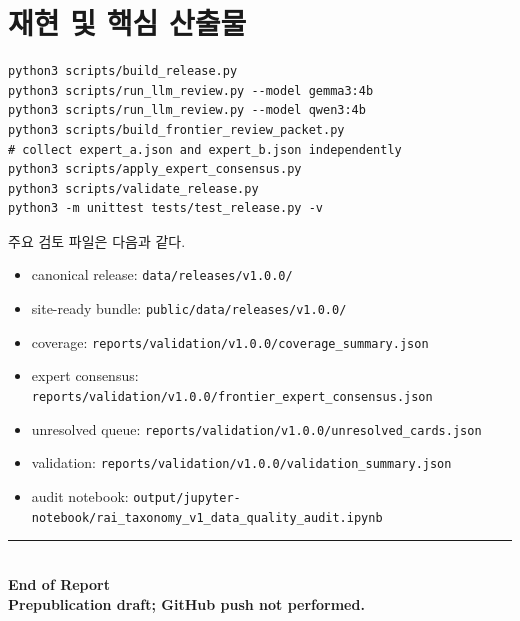 \documentclass[11pt,a4paper]{article}
\begin{document}
\section{재현 및 핵심 산출물}

\begin{lstlisting}[style=compact]
python3 scripts/build_release.py
python3 scripts/run_llm_review.py --model gemma3:4b
python3 scripts/run_llm_review.py --model qwen3:4b
python3 scripts/build_frontier_review_packet.py
# collect expert_a.json and expert_b.json independently
python3 scripts/apply_expert_consensus.py
python3 scripts/validate_release.py
python3 -m unittest tests/test_release.py -v
\end{lstlisting}

주요 검토 파일은 다음과 같다.

\begin{itemize}
  \item canonical release: \nolinkurl{data/releases/v1.0.0/}
  \item site-ready bundle: \nolinkurl{public/data/releases/v1.0.0/}
  \item coverage: \nolinkurl{reports/validation/v1.0.0/coverage_summary.json}
  \item expert consensus: \nolinkurl{reports/validation/v1.0.0/frontier_expert_consensus.json}
  \item unresolved queue: \nolinkurl{reports/validation/v1.0.0/unresolved_cards.json}
  \item validation: \nolinkurl{reports/validation/v1.0.0/validation_summary.json}
  \item audit notebook: \nolinkurl{output/jupyter-notebook/rai_taxonomy_v1_data_quality_audit.ipynb}
\end{itemize}

\vfill
\begin{center}
\color{reportblue}\rule{0.72\linewidth}{0.5pt}\\[0.45em]
\sffamily\bfseries End of Report\\
\sffamily\small Prepublication draft; GitHub push not performed.
\end{center}
\end{document}
